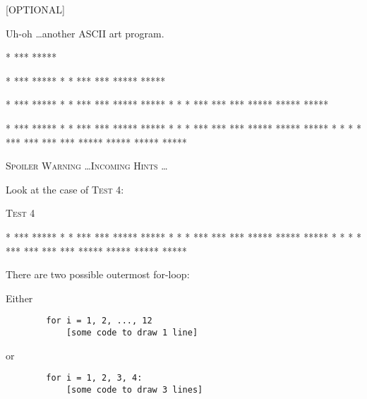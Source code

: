 [OPTIONAL]

Uh-oh \dots another ASCII art program.

\resett
\nextt
\begin{console}[commandchars=\\\{\}]
  *
 ***
*****
\end{console}

\nextt
\begin{console}[commandchars=\\\{\}]
     *
    ***
   *****
  *     *
 ***   *** 
***** *****
\end{console}

\nextt
\begin{console}[commandchars=\\\{\}]
        *
       ***
      *****
     *     *
    ***   *** 
   ***** *****
  *     *     *
 ***   ***   ***
***** ***** *****
\end{console}

\nextt
\begin{console}[commandchars=\\\{\}]
           *
          ***
         *****
        *     *
       ***   *** 
      ***** *****
     *     *     *
    ***   ***   ***
   ***** ***** *****
  *     *     *     *
 ***   ***   ***   ***
***** ***** ***** *****
\end{console}

\newpage

\textsc{\large Spoiler Warning \dots Incoming Hints \dots}

Look at the case of \textsc{Test 4:}

\textsc{Test 4}
\begin{console}[commandchars=\\\{\}]
           *
          ***
         *****
        *     *
       ***   *** 
      ***** *****
     *     *     *
    ***   ***   ***
   ***** ***** *****
  *     *     *     *
 ***   ***   ***   ***
***** ***** ***** *****
\end{console} 

There are two possible outermost for-loop: 

Either
\begin{verbatim}
        for i = 1, 2, ..., 12
            [some code to draw 1 line]
\end{verbatim}

or
\begin{verbatim}
        for i = 1, 2, 3, 4:
            [some code to draw 3 lines]
\end{verbatim}
